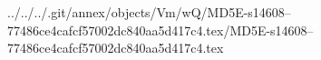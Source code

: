 ../../../.git/annex/objects/Vm/wQ/MD5E-s14608--77486ce4cafcf57002dc840aa5d417c4.tex/MD5E-s14608--77486ce4cafcf57002dc840aa5d417c4.tex